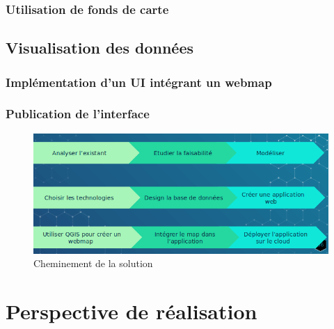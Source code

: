             \subsubsection{Utilisation de fonds de carte}
                
        \subsection{Visualisation des données} 
            \subsubsection{Implémentation d'un UI intégrant un webmap}
                
            \subsubsection{Publication de l'interface}
                
        \begin{figure}[t]
            \centering
            \includegraphics[width=1\textwidth]{images/Contexte/evolution_projetGIS.png}
            \caption{Cheminement de la solution}
        \end{figure}

    \section{Perspective de réalisation}
         
